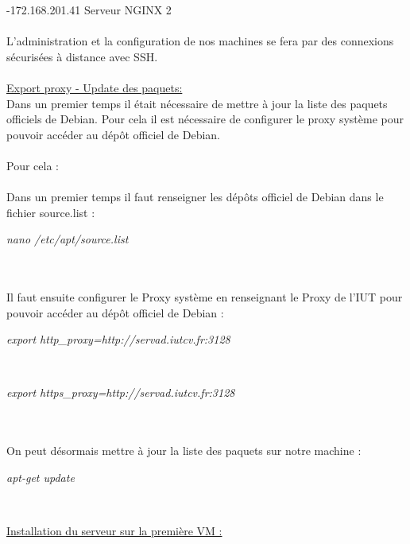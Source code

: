 \documentclass{report}
\begin{document}
    -172.168.201.41   \rightarrow Serveur NGINX 2
    \\
    \\
    
    L’administration et la configuration de nos machines se fera par des connexions sécurisées à distance avec SSH.
    \\
    \\
    
    \underline{Export proxy - Update des paquets: }\\
    
    Dans un premier temps il était nécessaire de mettre à jour la liste des paquets officiels de Debian. Pour cela il est nécessaire de configurer le proxy système pour pouvoir accéder au dépôt officiel de Debian.
    \\
    \\
    Pour cela :
    \\
    \\
    Dans un premier temps il faut renseigner les dépôts officiel de Debian dans le fichier source.list :

    \begin{center}
    \textit{nano /etc/apt/source.list}
    \end{center}
    \\
    \\
    Il faut ensuite configurer le Proxy système en renseignant le Proxy de l’IUT pour pouvoir accéder au dépôt officiel de Debian :

    \begin{center}
    \textit{export http\_proxy=http://servad.iutcv.fr:3128}
    \end{center}
    \\
    \begin{center}
    \textit{ export https\_proxy=http://servad.iutcv.fr:3128}
    \end{center}
    \\
    \\
    On peut désormais mettre à jour la liste des paquets sur notre machine : 


    \begin{center}
    \textit{apt-get update}
    \end{center}
    \\
    
    \hfill
    
    \underline{Installation du serveur sur la première VM :}\\
\end{document}

